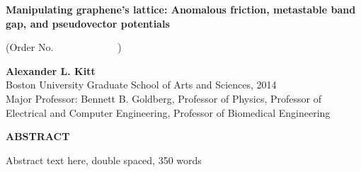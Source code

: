 \vspace{-0.2in}

\begin{center}

\textbf{Manipulating graphene's lattice: Anomalous friction, metastable band gap, and pseudovector potentials}\\
 
\vspace{0.2in}

(Order No.\ \ \ \ \ \ \ \ \ \ \ \ \ )\\

\vspace{0.2in}

\textbf{Alexander L. Kitt}\\
Boston University Graduate School of Arts and Sciences, 2014\\
Major Professor: Bennett B. Goldberg, Professor of Physics, Professor of Electrical and Computer Engineering, Professor of Biomedical Engineering\\

\vspace{0.4in}

\textbf{ABSTRACT}

\end{center}

\noindent
Abstract text here, double spaced, 350 words